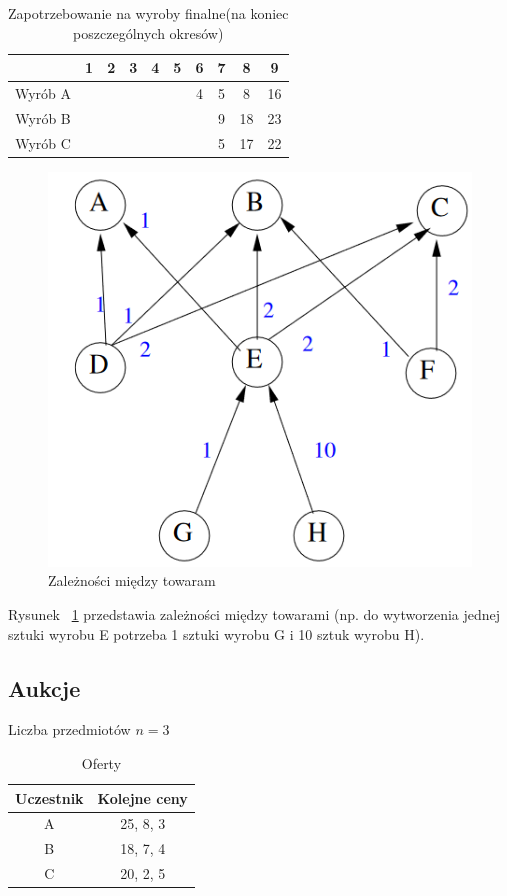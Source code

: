 \documentclass[
    12pt, %
]{../fphw}
\begin{document}
\begin{table}[H]
    \centering
    \begin{tabular}{| c | c | c | c | c | c | c | c | c | c |}
        \hline
                & 1 & 2 & 3 & 4 & 5 & 6 & 7 & 8  & 9  \\
        \hline
        Wyrób A &   &   &   &   &   & 4 & 5 & 8  & 16 \\
        \hline
        Wyrób B &   &   &   &   &   &   & 9 & 18 & 23 \\
        \hline
        Wyrób C &   &   &   &   &   &   & 5 & 17 & 22 \\
        \hline
    \end{tabular}
    \caption{Zapotrzebowanie na wyroby finalne(na koniec poszczególnych okresów)}
\end{table}

\begin{figure}[H]
    \centering
    \includegraphics[width=0.7\linewidth]{./img/zaleznosci.PNG}
    \caption{Zależności między towaram}
    \label{fig:graf-1}
\end{figure}

Rysunek ~\ref{fig:graf-1} przedstawia zależności między towarami
(np. do wytworzenia jednej sztuki wyrobu E potrzeba 1 sztuki wyrobu G i 10 sztuk wyrobu H).

\subsection{Aukcje}
Liczba przedmiotów \(n = 3\) \\
\begin{table}[H]
    \centering
    \begin{tabular}{| c | c |}
        \hline
        Uczestnik & Kolejne ceny \\
        \hline
        A         & 25, 8, 3     \\
        B         & 18, 7, 4     \\
        C         & 20, 2, 5     \\
        \hline
    \end{tabular}
    \caption{Oferty}
\end{table}
\end{document}
